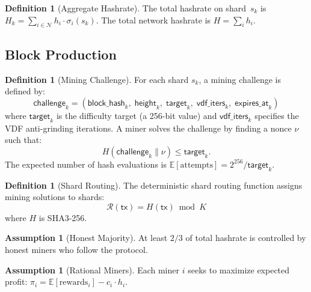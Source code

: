 \documentclass[11pt,a4paper]{article}
\theoremstyle{definition}
\newtheorem{definition}[theorem]{Definition}
\newtheorem{assumption}[theorem]{Assumption}
\theoremstyle{remark}
\newcommand{\payoff}{\pi}
\newcommand{\strategy}{\sigma}
\newcommand{\Players}{\mathcal{N}}
\newcommand{\hashrate}{h}
\newcommand{\Hashrate}{H}
\newcommand{\expect}{\mathbb{E}}
\begin{document}
\begin{definition}[Aggregate Hashrate]\label{def:aggregate}
The total hashrate on shard~$s_k$ is
$\Hashrate_k = \sum_{i \in \Players} \hashrate_i \cdot \strategy_i(s_k)$.
The total network hashrate is $\Hashrate = \sum_{i} \hashrate_i$.
\end{definition}

\subsection{Block Production}

\begin{definition}[Mining Challenge]\label{def:challenge}
For each shard $s_k$, a mining challenge is defined by:
\[
  \mathsf{challenge}_k = (\mathsf{block\_hash}_k,\;
  \mathsf{height}_k,\; \mathsf{target}_k,\;
  \mathsf{vdf\_iters}_k,\; \mathsf{expires\_at}_k)
\]
where $\mathsf{target}_k$ is the difficulty target (a 256-bit value)
and $\mathsf{vdf\_iters}_k$ specifies the VDF anti-grinding iterations.
A miner solves the challenge by finding a nonce $\nu$ such that:
\[
  H(\mathsf{challenge}_k \| \nu) \leq \mathsf{target}_k.
\]
The expected number of hash evaluations is
$\expect[\text{attempts}] = 2^{256} / \mathsf{target}_k$.
\end{definition}

\begin{definition}[Shard Routing]\label{def:routing}
The deterministic shard routing function assigns mining solutions
to shards:
\[
  \mathcal{R}(\mathsf{tx}) = H(\mathsf{tx}) \bmod K
\]
where $H$ is SHA3-256.
\end{definition}

\begin{assumption}[Honest Majority]\label{asm:honest}
At least $2/3$ of total hashrate is controlled by honest miners
who follow the protocol.
\end{assumption}

\begin{assumption}[Rational Miners]\label{asm:rational}
Each miner $i$ seeks to maximize expected profit:
$\payoff_i = \expect[\text{rewards}_i] - c_i \cdot \hashrate_i$.
\end{assumption}
\end{document}
